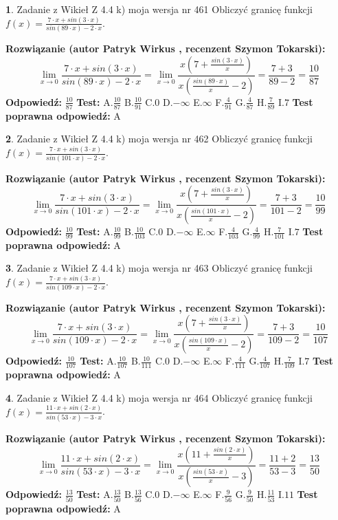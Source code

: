\documentclass[12pt, a4paper]{article}
\theoremstyle{definition} %
\newtheorem{zad}{}
\newcommand{\zadStart}[1]{\begin{zad}#1\newline}
\newcommand{\zadStop}{\end{zad}}
\newcommand{\rozwStart}[2]{\noindent \textbf{Rozwiązanie (autor #1 , recenzent #2): }\newline}
\newcommand{\rozwStop}{\newline}
\newcommand{\odpStart}{\noindent \textbf{Odpowiedź:}\newline}
\newcommand{\odpStop}{\newline}
\newcommand{\testStart}{\noindent \textbf{Test:}\newline}
\newcommand{\testStop}{\newline}
\newcommand{\kluczStart}{\noindent \textbf{Test poprawna odpowiedź:}\newline}
\newcommand{\kluczStop}{\newline}
\begin{document}
\zadStart{Zadanie z Wikieł Z 4.4 k) moja wersja nr 461}
Obliczyć granicę funkcji $f(x)=\frac{7\cdot x +sin(3\cdot x)}{sin(89\cdot x) -2\cdot x}$.
\zadStop
\rozwStart{Patryk Wirkus}{Szymon Tokarski}
$$\lim\limits_{x\to 0}\frac{7\cdot x +sin(3\cdot x)}{sin(89\cdot x) -2\cdot x}
=\lim\limits_{x\to 0}\frac{x(7+\frac{sin(3\cdot x)}{x})}{x(\frac{sin(89\cdot x)}{x}-2)}
=\frac{7+3}{89-2} = \frac{10}{87}$$
\rozwStop
\odpStart
$\frac{10}{87}$
\odpStop
\testStart
A.$\frac{10}{87}$
B.$\frac{10}{91}$
C.$0$
D.$-\infty$
E.$\infty$
F.$\frac{4}{91}$
G.$\frac{4}{87}$
H.$\frac{7}{89}$
I.$7$
\testStop
\kluczStart
A
\kluczStop



\zadStart{Zadanie z Wikieł Z 4.4 k) moja wersja nr 462}
Obliczyć granicę funkcji $f(x)=\frac{7\cdot x +sin(3\cdot x)}{sin(101\cdot x) -2\cdot x}$.
\zadStop
\rozwStart{Patryk Wirkus}{Szymon Tokarski}
$$\lim\limits_{x\to 0}\frac{7\cdot x +sin(3\cdot x)}{sin(101\cdot x) -2\cdot x}
=\lim\limits_{x\to 0}\frac{x(7+\frac{sin(3\cdot x)}{x})}{x(\frac{sin(101\cdot x)}{x}-2)}
=\frac{7+3}{101-2} = \frac{10}{99}$$
\rozwStop
\odpStart
$\frac{10}{99}$
\odpStop
\testStart
A.$\frac{10}{99}$
B.$\frac{10}{103}$
C.$0$
D.$-\infty$
E.$\infty$
F.$\frac{4}{103}$
G.$\frac{4}{99}$
H.$\frac{7}{101}$
I.$7$
\testStop
\kluczStart
A
\kluczStop



\zadStart{Zadanie z Wikieł Z 4.4 k) moja wersja nr 463}
Obliczyć granicę funkcji $f(x)=\frac{7\cdot x +sin(3\cdot x)}{sin(109\cdot x) -2\cdot x}$.
\zadStop
\rozwStart{Patryk Wirkus}{Szymon Tokarski}
$$\lim\limits_{x\to 0}\frac{7\cdot x +sin(3\cdot x)}{sin(109\cdot x) -2\cdot x}
=\lim\limits_{x\to 0}\frac{x(7+\frac{sin(3\cdot x)}{x})}{x(\frac{sin(109\cdot x)}{x}-2)}
=\frac{7+3}{109-2} = \frac{10}{107}$$
\rozwStop
\odpStart
$\frac{10}{107}$
\odpStop
\testStart
A.$\frac{10}{107}$
B.$\frac{10}{111}$
C.$0$
D.$-\infty$
E.$\infty$
F.$\frac{4}{111}$
G.$\frac{4}{107}$
H.$\frac{7}{109}$
I.$7$
\testStop
\kluczStart
A
\kluczStop



\zadStart{Zadanie z Wikieł Z 4.4 k) moja wersja nr 464}
Obliczyć granicę funkcji $f(x)=\frac{11\cdot x +sin(2\cdot x)}{sin(53\cdot x) -3\cdot x}$.
\zadStop
\rozwStart{Patryk Wirkus}{Szymon Tokarski}
$$\lim\limits_{x\to 0}\frac{11\cdot x +sin(2\cdot x)}{sin(53\cdot x) -3\cdot x}
=\lim\limits_{x\to 0}\frac{x(11+\frac{sin(2\cdot x)}{x})}{x(\frac{sin(53\cdot x)}{x}-3)}
=\frac{11+2}{53-3} = \frac{13}{50}$$
\rozwStop
\odpStart
$\frac{13}{50}$
\odpStop
\testStart
A.$\frac{13}{50}$
B.$\frac{13}{56}$
C.$0$
D.$-\infty$
E.$\infty$
F.$\frac{9}{56}$
G.$\frac{9}{50}$
H.$\frac{11}{53}$
I.$11$
\testStop
\kluczStart
A
\kluczStop
\end{document}
